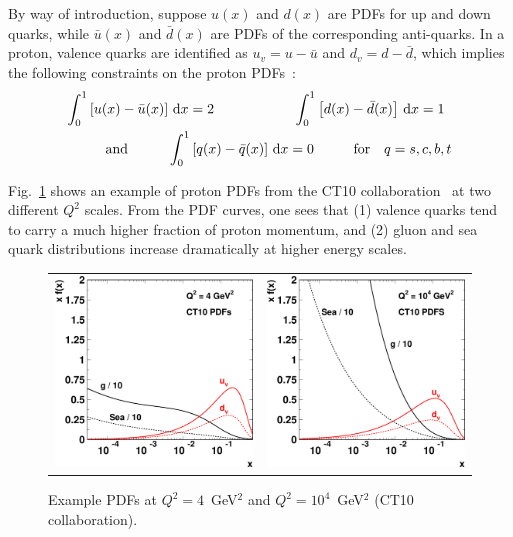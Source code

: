 By way of introduction, suppose $u(x)$ and $d(x)$ are PDFs for up and down quarks, while $\bar{u}(x)$ and $\bar{d}(x)$ are PDFs of the corresponding anti-quarks. In a proton, valence quarks are identified as $u_v=u-{\bar u}$ and $d_v=d-{\bar d}$, which implies the following constraints on the proton PDFs~\cite{0034-4885-76-4-046201}:
\begin{eqnarray}
\int_0^1 \left[u(x)-\bar{u}(x) \right] \, {\rm d}x = 2   \hspace{2cm}  
\int_0^1 \left[d(x)-\bar{d}(x) \right] \, {\rm d}x = 1 \,\,\,   \label{eq:countingrule} \\
{\rm{and}} \hspace{1cm} \int_0^1 \left[q(x)-\bar{q}(x) \right] \, {\rm d}x = 0 \hspace{1cm} {\rm{for }} \quad q=s,c,b,t
\label{eq:countingrule2}
\end{eqnarray}

Fig.~\ref{fig:example_pdfs} shows an example of proton PDFs from the CT10 collaboration~\cite{Lai:2010vv} at two different $Q^2$ scales. From the PDF curves, one sees that (1) valence quarks tend to carry a much higher fraction of proton momentum, and (2) gluon and sea quark distributions increase dramatically at higher energy scales.

\begin{figure}[htb]
\begin{center}
\begin{tabular}{cc}
\includegraphics[width=0.45\columnwidth]{theory/fig/examplepdfs_q2} &
\includegraphics[width=0.45\columnwidth]{theory/fig/examplepdfs_q100}
\end{tabular}
\end{center}
\caption{ Example PDFs at $Q^2 = 4$~GeV$^2$ and $Q^2 = 10^4$~GeV$^2$ (CT10 collaboration). }
\label{fig:example_pdfs}
\end{figure}

